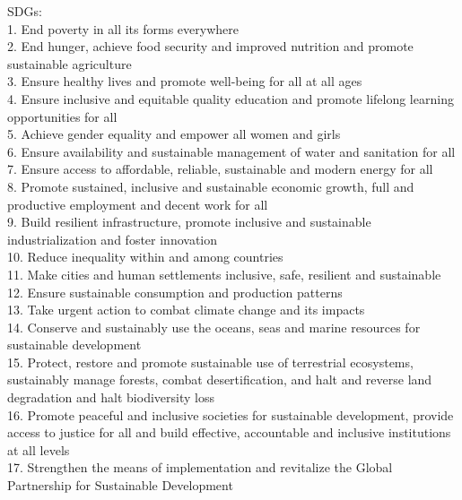 \begin{appendices}
SDGs: \\
1. End poverty in all its forms everywhere  \\
2. End hunger, achieve food security and improved nutrition and promote
sustainable agriculture \\
3. Ensure healthy lives and promote well-being for all at all ages \\
4. Ensure inclusive and equitable quality education and promote lifelong
learning opportunities for all \\
5. Achieve gender equality and empower all women and girls \\
6. Ensure availability and sustainable management of water and sanitation
for all \\
7. Ensure access to affordable, reliable, sustainable and modern energy for
all \\
8. Promote sustained, inclusive and sustainable economic growth, full and
productive employment and decent work for all \\
9. Build resilient infrastructure, promote inclusive and sustainable
industrialization and foster innovation \\
10. Reduce inequality within and among countries \\
11. Make cities and human settlements inclusive, safe, resilient and
sustainable \\
12. Ensure sustainable consumption and production patterns \\
13. Take urgent action to combat climate change and its impacts \\
14. Conserve and sustainably use the oceans, seas and marine resources
for sustainable development \\
15. Protect, restore and promote sustainable use of terrestrial ecosystems,
sustainably manage forests, combat desertification, and halt and reverse land
degradation and halt biodiversity loss \\
16. Promote peaceful and inclusive societies for sustainable development,
provide access to justice for all and build effective, accountable and inclusive
institutions at all levels \\
17. Strengthen the means of implementation and revitalize the Global
Partnership for Sustainable Development \\
\begin{table}[h]
\centering
\renewcommand{\arraystretch}{1.4}
\setlength{\tabcolsep}{4pt}

\end{table}
\end{appendices}
